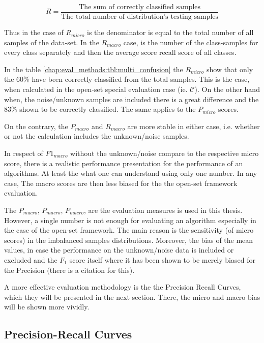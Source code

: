 \begin{equation}\label{chap:eval_methods:eq:recall_theory}
	R = \frac {\text{The sum of correctly classified samples}} {\text{The total number of distribution's testing samples}}
\end{equation}

Thus in the case of $R_{micro}$ is the denominator is equal to the total number of all samples of the data-set. In the $R_{macro}$ case, is the number of the class-samples for every class separately and then the average score recall score of all classes.

In the table \ref{chap:eval_methods:tbl:multi_confusion} the $R_{micro}$ show that only the $60\%$ have been correctly classified from the total samples. This is the case, when calculated in the open-set special evaluation case (ie. $\mathcal{C}$). On the other hand when, the noise/unknown samples are included there is a great difference and the $83\%$ shown to be correctly classified. The same applies to the $P_{micro}$ scores.

On the contrary, the $P_{macro}$ and $R_{macro}$ are more stable in either case, i.e. whether or not the calculation includes the unknown/noise samples.

In respect of $F1_{macro}$ without the unknown/noise compare to the respective micro score, there is a realistic performance presentation for the performance of an algorithms. At least the what one can understand using only one number. In any case, The macro scores are then less biased for the the open-set framework evaluation.  

The $P_{macro}$, $P_{macro}$, $P_{macro}$, are the evaluation measures is used in this thesis. However, a single number is not enough for evaluating an algorithm especially in the case of the open-set framework. The main reason is the sensitivity (of micro scores) in the imbalanced samples distributions. Moreover, the bias of the mean values, in case the performance on the unknown/noise data is included or excluded and the $F_{1}$ score itself where it has been shown to be merely biased for the Precision (there is a citation for this). 

A more effective evaluation methodology is the the Precision Recall Curves, which they will be presented in the next section. There, the micro and macro bias will be shown more vividly.


\subsection{Precision-Recall Curves}\label{chap:eval_methods:sec:roc_prc}

